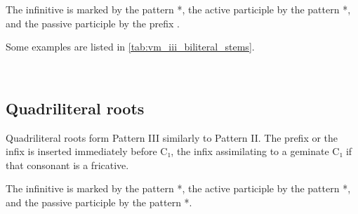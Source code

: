 \documentclass[grammar]{subfiles}
\begin{document}
The infinitive is marked by the pattern *, the active participle by the
pattern *, and the passive participle by the prefix .  

Some examples are listed in \cref{tab:vm_iii_biliteral_stems}. 

\begin{table}[h!]\small\capstart
  \centering
  \\
  \caption{Pattern III biliteral stems \label{tab:vm_iii_biliteral_stems}}
\end{table}


\subsection{Quadriliteral roots}
\label{ssec:vm_iii_quadriliteral_roots}

Quadriliteral roots form Pattern III similarly to Pattern II. The prefix
 or the infix  is inserted immediately before C₁, the infix
assimilating to a geminate C₁ if that consonant is a fricative. 

The infinitive is marked by the pattern *, the active participle
by the pattern *, and the passive participle by the pattern
*.  
\end{document}
